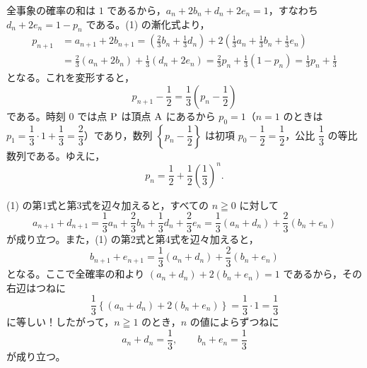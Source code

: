 
全事象の確率の和は $1$ であるから，$a_{n}+2b_{n}+d_{n}+2e_{n}=1$，すなわち $d_{n}+2e_{n}=1-p_{n}$ である。(1) の漸化式より，
\begin{align*}
  p_{n+1} &= a_{n+1} + 2b_{n+1}
  = \left(\frac{2}{3}b_{n}+\frac{1}{3}d_{n}\right) + 2\left(\frac{1}{3}a_{n}+\frac{1}{3}b_{n}+\frac{1}{3}e_{n}\right) \\
  &= \frac{2}{3}(a_{n}+2b_{n}) + \frac{1}{3}(d_{n}+2e_{n})
  = \frac{2}{3}p_{n} + \frac{1}{3}(1-p_{n}) = \frac{1}{3}p_{n} + \frac{1}{3}
\end{align*}
となる。これを変形すると，
\[
  p_{n+1} - \frac{1}{2} = \frac{1}{3}\left(p_{n}-\frac{1}{2}\right)
\]
である。時刻 $0$ では点 $\mathrm{P}$ は頂点 $\mathrm{A}$ にあるから $p_{0}=1$（$n=1$ のときは $p_{1}=\dfrac{1}{3}\cdot 1+\dfrac{1}{3}=\dfrac{2}{3}$）であり，数列 $\left\{p_{n}-\dfrac{1}{2}\right\}$ は初項 $p_{0}-\dfrac{1}{2}=\dfrac{1}{2}$，公比 $\dfrac{1}{3}$ の等比数列である。ゆえに，
\[
  p_{n} = \frac{1}{2} + \frac{1}{2}\left(\frac{1}{3}\right)^{n}.
\]


(1) の第1式と第3式を辺々加えると，すべての $n\geqq 0$ に対して
\[
  a_{n+1} + d_{n+1} = \frac{1}{3}a_{n} + \frac{2}{3}b_{n} + \frac{1}{3}d_{n} + \frac{2}{3}e_{n}
  = \frac{1}{3}(a_{n}+d_{n}) + \frac{2}{3}(b_{n}+e_{n})
\]
が成り立つ。また，(1) の第2式と第4式を辺々加えると，
\[
  b_{n+1} + e_{n+1} = \frac{1}{3}(a_{n}+d_{n}) + \frac{2}{3}(b_{n}+e_{n})
\]
となる。ここで全確率の和より $(a_{n}+d_{n})+2(b_{n}+e_{n})=1$ であるから，その右辺はつねに
\[
  \frac{1}{3}\left\{(a_{n}+d_{n})+2(b_{n}+e_{n})\right\} = \frac{1}{3}\cdot 1 = \frac{1}{3}
\]
に等しい！したがって，$n\geqq 1$ のとき，$n$ の値によらずつねに
\[
  a_{n} + d_{n} = \frac{1}{3},\qquad b_{n} + e_{n} = \frac{1}{3}
\]
が成り立つ。


